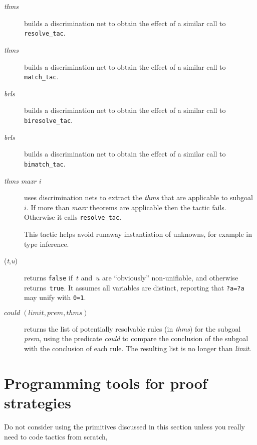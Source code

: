 \begin{description}
\item[ {\it thms}] 
builds a discrimination net to obtain the effect of a similar call to {\tt
resolve_tac}.

\item[ {\it thms}] 
builds a discrimination net to obtain the effect of a similar call to {\tt
match_tac}.

\item[ {\it brls}] 
builds a discrimination net to obtain the effect of a similar call to {\tt
biresolve_tac}.

\item[ {\it brls}] 
builds a discrimination net to obtain the effect of a similar call to {\tt
bimatch_tac}.

\item[ {\it thms} {\it maxr} {\it i}] 
uses discrimination nets to extract the {\it thms} that are applicable to
subgoal~$i$.  If more than {\it maxr\/} theorems are applicable then the
tactic fails.  Otherwise it calls {\tt resolve_tac}.  

This tactic helps avoid runaway instantiation of unknowns, for example in
type inference.

\item[ ({\it t},{\it u})] 
returns {\tt false} if~$t$ and~$u$ are ``obviously'' non-unifiable, and
otherwise returns~{\tt true}.  It assumes all variables are distinct,
reporting that {\tt ?a=?a} may unify with {\tt 0=1}.

\item[ $could\; (limit,prem,thms)$] 
returns the list of potentially resolvable rules (in {\it thms\/}) for the
subgoal {\it prem}, using the predicate {\it could\/} to compare the
conclusion of the subgoal with the conclusion of each rule.  The resulting list
is no longer than {\it limit}.
\end{description}


\section{Programming tools for proof strategies}
Do not consider using the primitives discussed in this section unless you
really need to code tactics from scratch,

